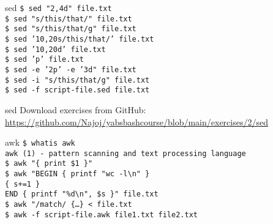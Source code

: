 \documentclass{beamer}
\let\tt\texttt
\begin{document}
\begin{frame}{sed}
        \tt{\$ sed "2,4d"              file.txt}\\
        \tt{\$ sed "s/this/that/"      file.txt}\\  
        \tt{\$ sed "s/this/that/g"     file.txt}\\  
        \tt{\$ sed '10,20s/this/that/' file.txt}\\  
        \tt{\$ sed '10,20d'            file.txt}\\  
        \tt{\$ sed 'p'                 file.txt}\\  
        \tt{\$ sed -e '2p' -e '3d"     file.txt}\\  
        \tt{\$ sed -i "s/this/that/g"  file.txt}\\  
        \tt{\$ sed -f script-file.sed  file.txt}\\  
\end{frame}

\begin{frame}{sed}
        Download exercises from GitHub: \\
        \url{https://github.com/Najoj/yabsbashcourse/blob/main/exercises/2/sed}
\end{frame}

\begin{frame}{awk}
        \tt{\$ whatis awk}\\
        \tt{awk (1)   - pattern scanning and text processing language}\\
        \tt{\$ awk "\{ print \$1 \}" } \\
        \tt{\$ awk "BEGIN \{ printf "wc -l{\textbackslash}n" \} } \\
        \tt{\quad \quad \{ s+=1 \}} \\
        \tt{\quad END \{ printf "\%d{\textbackslash}n", \$s \}" file.txt } \\
        \tt{\$ awk "/match/ \{\ldots \} < file.txt } \\
        \tt{\$ awk -f script-file.awk file1.txt file2.txt } \\
\end{frame}
\end{document}
